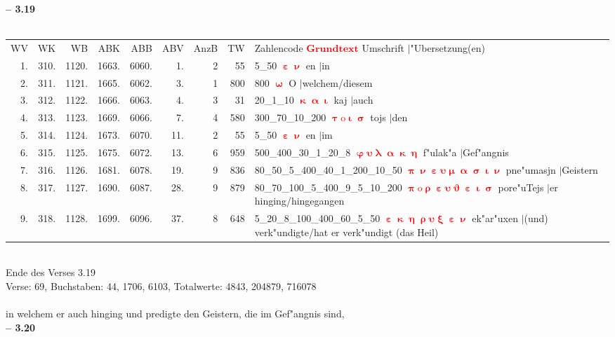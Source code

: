 \documentclass[a4paper,10pt,landscape]{article}
\begin{document}
\newpage 
{\bf -- 3.19}\\
\medskip \\
\begin{tabular}{rrrrrrrrp{120mm}}
WV&WK&WB&ABK&ABB&ABV&AnzB&TW&Zahlencode \textcolor{red}{$\boldsymbol{Grundtext}$} Umschrift $|$"Ubersetzung(en)\\
1.&310.&1120.&1663.&6060.&1.&2&55&5\_50 \textcolor{red}{$\boldsymbol{\upepsilon\upnu}$} en $|$in\\
2.&311.&1121.&1665.&6062.&3.&1&800&800 \textcolor{red}{$\boldsymbol{\upomega}$} O $|$welchem/diesem\\
3.&312.&1122.&1666.&6063.&4.&3&31&20\_1\_10 \textcolor{red}{$\boldsymbol{\upkappa\upalpha\upiota}$} kaj $|$auch\\
4.&313.&1123.&1669.&6066.&7.&4&580&300\_70\_10\_200 \textcolor{red}{$\boldsymbol{\uptau\mathrm{o}\upiota\upsigma}$} tojs $|$den\\
5.&314.&1124.&1673.&6070.&11.&2&55&5\_50 \textcolor{red}{$\boldsymbol{\upepsilon\upnu}$} en $|$im\\
6.&315.&1125.&1675.&6072.&13.&6&959&500\_400\_30\_1\_20\_8 \textcolor{red}{$\boldsymbol{\upvarphi\upsilon\uplambda\upalpha\upkappa\upeta}$} f"ulak"a $|$Gef"angnis\\
7.&316.&1126.&1681.&6078.&19.&9&836&80\_50\_5\_400\_40\_1\_200\_10\_50 \textcolor{red}{$\boldsymbol{\uppi\upnu\upepsilon\upsilon\upmu\upalpha\upsigma\upiota\upnu}$} pne"umasjn $|$Geistern\\
8.&317.&1127.&1690.&6087.&28.&9&879&80\_70\_100\_5\_400\_9\_5\_10\_200 \textcolor{red}{$\boldsymbol{\uppi\mathrm{o}\uprho\upepsilon\upsilon\upvartheta\upepsilon\upiota\upsigma}$} pore"uTejs $|$er hinging/hingegangen\\
9.&318.&1128.&1699.&6096.&37.&8&648&5\_20\_8\_100\_400\_60\_5\_50 \textcolor{red}{$\boldsymbol{\upepsilon\upkappa\upeta\uprho\upsilon\upxi\upepsilon\upnu}$} ek"ar"uxen $|$(und) verk"undigte/hat er verk"undigt (das Heil)\\
\end{tabular}\medskip \\
Ende des Verses 3.19\\
Verse: 69, Buchstaben: 44, 1706, 6103, Totalwerte: 4843, 204879, 716078\\
\\
in welchem er auch hinging und predigte den Geistern, die im Gef"angnis sind,\\
\newpage 
{\bf -- 3.20}\\
\medskip \\
\end{document}
